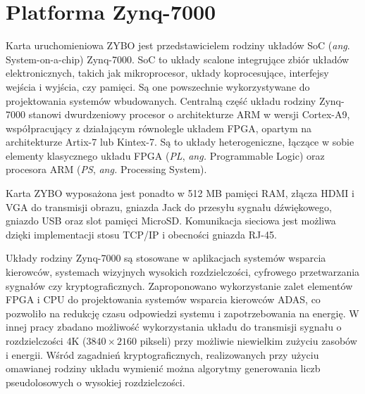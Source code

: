 \chapter{Platforma Zynq-7000}
\label{cha:platform}

Karta uruchomieniowa ZYBO jest przedstawicielem rodziny układów SoC (\emph{ang}. System-on-a-chip) Zynq-7000. %
SoC to układy scalone integrujące zbiór układów elektronicznych, takich jak mikroprocesor, układy koprocesujące, interfejsy wejścia i wyjścia, czy pamięci. Są one powszechnie wykorzystywane do projektowania systemów wbudowanych. %
Centralną część układu rodziny Zynq-7000 stanowi dwurdzeniowy procesor o architekturze ARM w wersji Cortex-A9, współpracujący z działającym równolegle układem FPGA, opartym na architekturze Artix-7 lub Kintex-7. \cite{zynq-homepage} %
Są to układy heterogeniczne, łączące w sobie elementy klasycznego układu FPGA (\emph{PL}, \emph{ang.} Programmable Logic) oraz procesora ARM (\emph{PS}, \emph{ang.} Processing System). %

Karta ZYBO wyposażona jest ponadto w 512 MB pamięci RAM, złącza HDMI i VGA do transmisji obrazu, gniazda Jack do przesyłu sygnału dźwiękowego, gniazdo USB oraz slot pamięci MicroSD. %
Komunikacja sieciowa jest możliwa dzięki implementacji stosu TCP/IP i obecności gniazda RJ-45. \cite{zynq-datasheet}

Układy rodziny Zynq-7000 są stosowane w aplikacjach systemów wsparcia kierowców, systemach wizyjnych wysokich rozdzielczości, cyfrowego przetwarzania sygnałów czy kryptograficznych. Zaproponowano wykorzystanie zalet elementów FPGA i CPU do projektowania systemów wsparcia kierowców ADAS, co pozwoliło na redukcję czasu odpowiedzi systemu i zapotrzebowania na energię. \cite{GuanwenZhong}
W innej pracy zbadano możliwość wykorzystania układu do transmisji sygnału o rozdzielczości 4K ($3840 \times 2160$ pikseli) przy możliwie niewielkim zużyciu zasobów i energii. \cite{MaleenAbeydeera}
Wśród zagadnień kryptograficznych, realizowanych przy użyciu omawianej rodziny układu wymienić można algorytmy generowania liczb pseudolosowych o wysokiej rozdzielczości.	\cite{PawelDabal2014} %

